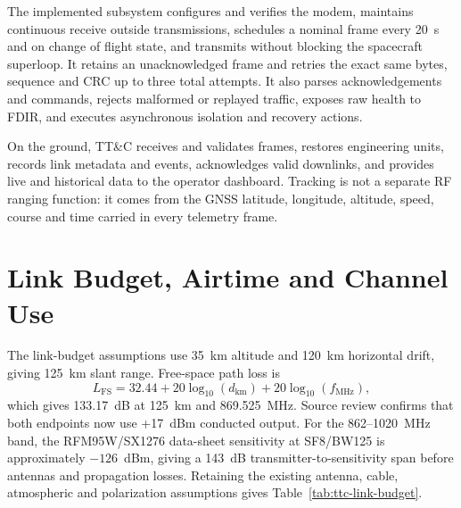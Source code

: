 The implemented subsystem configures and verifies the modem, maintains
continuous receive outside transmissions, schedules a nominal frame every
20~s and on change of flight state, and transmits without blocking the spacecraft
superloop. It retains an unacknowledged frame and retries the exact same bytes,
sequence and CRC up to three total attempts. It also parses acknowledgements
and commands, rejects malformed or replayed traffic, exposes raw health to
FDIR, and executes asynchronous isolation and recovery actions.

On the ground, TT\&C receives and validates frames, restores engineering units,
records link metadata and events, acknowledges valid downlinks, and provides
live and historical data to the operator dashboard. Tracking is not a separate
RF ranging function: it comes from the GNSS latitude, longitude, altitude,
speed, course and time carried in every telemetry frame.

\section{Link Budget, Airtime and Channel Use}
\label{sec:ttc-link-budget}

The link-budget assumptions use 35~km altitude and 120~km horizontal drift,
giving 125~km slant range. Free-space path loss is
\begin{equation}
L_{\mathrm{FS}} = 32.44 + 20\log_{10}(d_{\mathrm{km}})
                 + 20\log_{10}(f_{\mathrm{MHz}}),
\end{equation}
which gives 133.17~dB at 125~km and 869.525~MHz. Source review confirms that
both endpoints now use +17~dBm conducted output. For the 862--1020~MHz band,
the RFM95W/SX1276 data-sheet sensitivity at SF8/BW125 is approximately
$-126$~dBm, giving a 143~dB transmitter-to-sensitivity span before antennas and
propagation losses. Retaining the existing antenna, cable, atmospheric and
polarization assumptions gives Table~\ref{tab:ttc-link-budget}.

